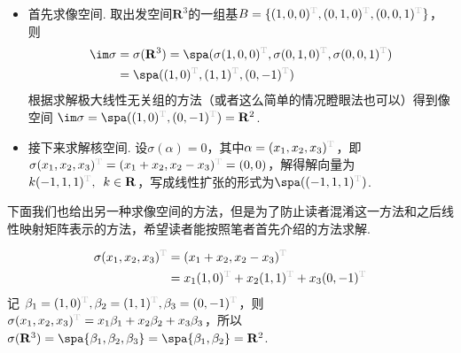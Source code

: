 \begin{solution}
    \begin{itemize}
        \item 首先求像空间. 取出发空间$\mathbf{R}^3$的一组基$B=\{(1,0,0)^{\color{lightgray}\mathrm{T}},(0,1,0)^{\color{lightgray}\mathrm{T}},(0,0,1)^{\color{lightgray}\mathrm{T}}\}$，则
        \begin{align*}
            \im \sigma &=\sigma(\mathbf{R}^3) = \spa(
                \sigma(1,0,0)^{\color{lightgray}\mathrm{T}},
                \sigma(0,1,0)^{\color{lightgray}\mathrm{T}},
                \sigma(0,0,1)^{\color{lightgray}\mathrm{T}}
                 ) \\
            &=\spa(
                (1,0)^{\color{lightgray}\mathrm{T}},
                (1,1)^{\color{lightgray}\mathrm{T}},
                (0,-1)^{\color{lightgray}\mathrm{T}}
                )
        \end{align*}
        根据求解极大线性无关组的方法（或者这么简单的情况瞪眼法也可以）得到像空间
        $\im \sigma=\spa((1,0)^{\color{lightgray}\mathrm{T}},(0,-1)^{\color{lightgray}\mathrm{T}})=\mathbf{R}^2$.

        \item 接下来求解核空间. 设$\sigma(\alpha)=0$，其中$\alpha=(x_1,x_2,x_3)^{\color{lightgray}\mathrm{T}}$，即$\sigma(x_1,x_2,x_3)^{\color{lightgray}\mathrm{T}}=(x_1+x_2,x_2-x_3)^{\color{lightgray}\mathrm{T}}=(0,0)$，解得解向量为$k(-1,1,1)^{\color{lightgray}\mathrm{T}},\enspace k\in\mathbf{R}$，写成线性扩张的形式为$\spa((-1,1,1)^{\color{lightgray}\mathrm{T}})$.
    \end{itemize}
\end{solution}

下面我们也给出另一种求像空间的方法，但是为了防止读者混淆这一方法和之后线性映射矩阵表示的方法，希望读者能按照笔者首先介绍的方法求解.
\begin{solution}\label{ex:线性映射的像空间求解2}
    \begin{align*}
        \sigma(x_1, x_2, x_3)^{\color{lightgray}\mathrm{T}} &= (x_1 + x_2, x_2 - x_3)^{\color{lightgray}\mathrm{T}}\\
        &= x_1(1, 0)^{\color{lightgray}\mathrm{T}} + x_2(1, 1)^{\color{lightgray}\mathrm{T}} + x_3(0, -1)^{\color{lightgray}\mathrm{T}}
    \end{align*}
    记 $\beta_1 = (1, 0)^{\color{lightgray}\mathrm{T}}, \beta_2 = (1, 1)^{\color{lightgray}\mathrm{T}}, \beta_3 = (0, -1)^{\color{lightgray}\mathrm{T}}$，则 $\sigma(x_1, x_2, x_3)^{\color{lightgray}\mathrm{T}} = x_1 \beta_1 + x_2 \beta_2 + x_3 \beta_3$，所以 $\sigma(\mathbf{R}^3) = \spa\{\beta_1, \beta_2, \beta_3\} = \spa \{\beta_1, \beta_2\}=\mathbf{R}^2$.
\end{solution}


